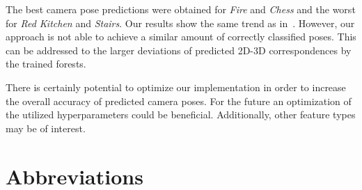 \documentclass[final]{cvpr}
\begin{document}
The best camera pose predictions were obtained for \textit{Fire} and \textit{Chess} and the worst for \textit{Red Kitchen}
and \textit{Stairs}. Our results show the same trend as in~\cite{shotton2013}. However, our approach is not able
to achieve a similar amount of correctly classified poses. This can be addressed to the larger deviations of predicted
2D-3D correspondences by the trained forests. 

There is certainly potential to optimize our implementation in order to increase the overall accuracy of predicted camera poses.
For the future an optimization of the utilized hyperparameters could be beneficial. Additionally, other feature types may be 
of interest.

\section*{Abbreviations}
\begin{acronym}[SIFT]
\end{acronym}

\hfill

{\small


}
\end{document}
